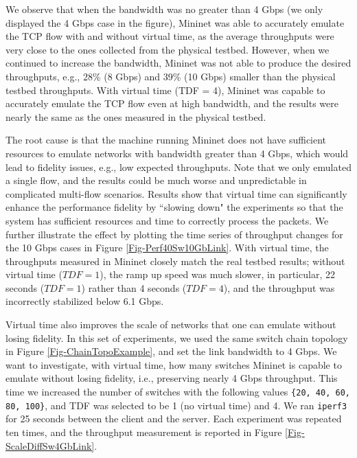 We observe that when the bandwidth was no greater than 4 Gbps (we only displayed the 4 Gbps case in the figure),  Mininet was able to accurately emulate the TCP flow with and without virtual time, as the average throughputs were very close to the ones collected from the physical testbed. However, when we continued to increase the bandwidth, Mininet was not able to produce the desired throughputs, e.g., 28\% (8 Gbps) and 39\% (10 Gbps) smaller than the physical testbed throughputs. With virtual time (TDF = 4), Mininet was capable to accurately emulate the TCP flow even at high bandwidth, and the results were nearly the same as the ones measured in the physical testbed. 

The root cause is that the machine running Mininet does not have sufficient resources to emulate networks with bandwidth greater than 4 Gbps, which would lead to fidelity issues, e.g., low expected throughputs.
Note that we only emulated a single flow, and the results could be much worse and unpredictable in complicated multi-flow scenarios. Results show that virtual time can significantly enhance the performance fidelity by ``slowing down" the experiments so that the system has sufficient resources and time to correctly process the packets. We further illustrate the effect by plotting the time series of throughput changes for the 10 Gbps cases in Figure \ref{Fig-Perf40Sw10GbLink}. With virtual time, the throughputs measured in Mininet closely match the real testbed results; without virtual time ($TDF = 1$), the ramp up speed was much slower, in particular, 22 seconds ($TDF = 1$) rather than 4 seconds ($TDF = 4$), and the throughput was incorrectly stabilized below 6.1 Gbps.

Virtual time also improves the scale of networks that one can emulate without losing fidelity. In this set of experiments, we used the same switch chain topology in Figure \ref{Fig-ChainTopoExample}, and set the link bandwidth to 4 Gbps. We want to investigate, with virtual time, how many switches Mininet is capable to emulate without losing fidelity, i.e., preserving nearly 4 Gbps throughput. This time we increased the number of switches with the following values \texttt{\{20, 40, 60, 80, 100\}}, and TDF was selected to be 1 (no virtual time) and 4. We ran \texttt{iperf3} for 25 seconds between the client and the server. Each experiment was repeated ten times, and the throughput measurement is reported in Figure \ref{Fig-ScaleDiffSw4GbLink}.

